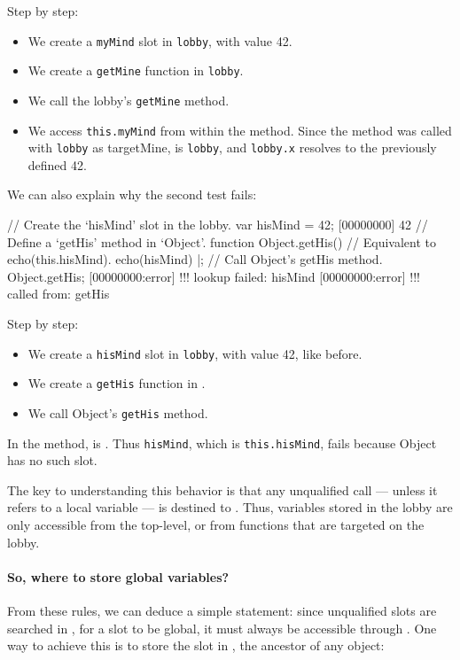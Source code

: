Step by step:
\begin{itemize}
\item We create a \lstinline|myMind| slot in \lstinline|lobby|, with
  value 42.
\item We create a \lstinline|getMine| function in \lstinline|lobby|.
\item We call the lobby's \lstinline|getMine| method.
\item We access \lstinline|this.myMind| from within the method. Since
  the method was called with \lstinline|lobby| as targetMine,
  \this is \lstinline|lobby|, and \lstinline|lobby.x|
  resolves to the previously defined 42.
\end{itemize}

We can also explain why the second test fails:

\begin{urbiscript}
// Create the `hisMind' slot in the lobby.
var hisMind = 42;
[00000000] 42
// Define a `getHis' method in `Object'.
function Object.getHis()
{
  // Equivalent to echo(this.hisMind).
  echo(hisMind)
}|;
// Call Object's getHis method.
Object.getHis;
[00000000:error] !!! lookup failed: hisMind
[00000000:error] !!!    called from: getHis
\end{urbiscript}

Step by step:
\begin{itemize}
\item We create a \lstinline|hisMind| slot in \lstinline|lobby|, with
  value 42, like before.
\item We create a \lstinline|getHis| function in .
\item We call Object's \lstinline|getHis| method.
\end{itemize}

In the method, \this is . Thus \lstinline|hisMind|, which
is \lstinline|this.hisMind|, fails because Object has no such slot.

The key to understanding this behavior is that any unqualified call
--- unless it refers to a local variable --- is destined to
\this. Thus, variables stored in the lobby are only
accessible from the top-level, or from functions that are targeted on
the lobby.

\paragraph{So, where to store global variables?}
From these rules, we can deduce a simple statement: since unqualified slots
are searched in \this, for a slot to be global, it must always be accessible
through \this. One way to achieve this is to store the slot in
, the ancestor of any object:


